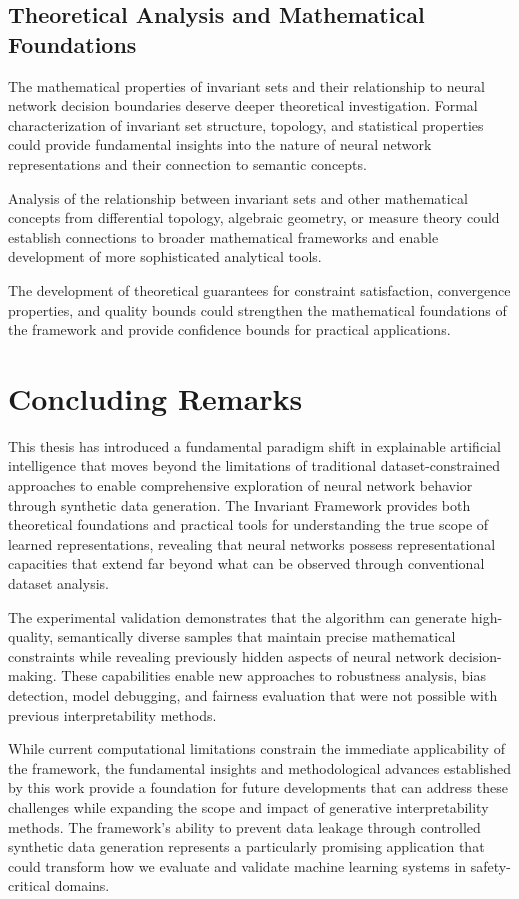 \subsection{Theoretical Analysis and Mathematical Foundations}

The mathematical properties of invariant sets and their relationship to neural network decision boundaries deserve deeper theoretical investigation. Formal characterization of invariant set structure, topology, and statistical properties could provide fundamental insights into the nature of neural network representations and their connection to semantic concepts.

Analysis of the relationship between invariant sets and other mathematical concepts from differential topology, algebraic geometry, or measure theory could establish connections to broader mathematical frameworks and enable development of more sophisticated analytical tools.

The development of theoretical guarantees for constraint satisfaction, convergence properties, and quality bounds could strengthen the mathematical foundations of the framework and provide confidence bounds for practical applications.

\section{Concluding Remarks}

This thesis has introduced a fundamental paradigm shift in explainable artificial intelligence that moves beyond the limitations of traditional dataset-constrained approaches to enable comprehensive exploration of neural network behavior through synthetic data generation. The Invariant Framework provides both theoretical foundations and practical tools for understanding the true scope of learned representations, revealing that neural networks possess representational capacities that extend far beyond what can be observed through conventional dataset analysis.

The experimental validation demonstrates that the \method{} algorithm can generate high-quality, semantically diverse samples that maintain precise mathematical constraints while revealing previously hidden aspects of neural network decision-making. These capabilities enable new approaches to robustness analysis, bias detection, model debugging, and fairness evaluation that were not possible with previous interpretability methods.

While current computational limitations constrain the immediate applicability of the framework, the fundamental insights and methodological advances established by this work provide a foundation for future developments that can address these challenges while expanding the scope and impact of generative interpretability methods. The framework's ability to prevent data leakage through controlled synthetic data generation represents a particularly promising application that could transform how we evaluate and validate machine learning systems in safety-critical domains.

